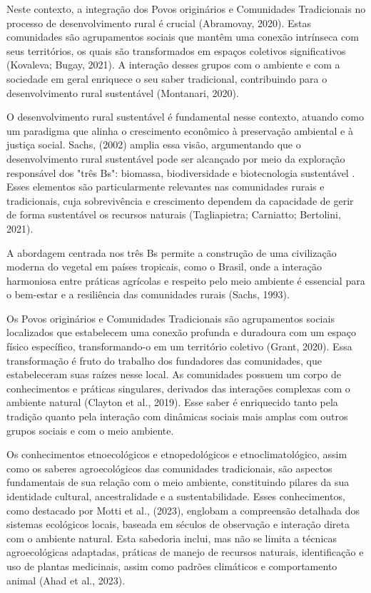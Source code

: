 Neste contexto, a integração dos Povos originários e Comunidades Tradicionais no processo de desenvolvimento rural é crucial (Abramovay, 2020). Estas comunidades são agrupamentos sociais que mantêm uma conexão intrínseca com seus territórios, os quais são transformados em espaços coletivos significativos (Kovaleva; Bugay, 2021). A interação desses grupos com o ambiente e com a sociedade em geral enriquece o seu saber tradicional, contribuindo para o desenvolvimento rural sustentável (Montanari, 2020).

O desenvolvimento rural sustentável é fundamental nesse contexto, atuando como um paradigma que alinha o crescimento econômico à preservação ambiental e à justiça social. Sachs, (2002) amplia essa visão, argumentando que o desenvolvimento rural sustentável pode ser alcançado por meio da exploração responsável dos "três Bs": biomassa, biodiversidade e biotecnologia sustentável . Esses elementos são particularmente relevantes nas comunidades rurais e tradicionais, cuja sobrevivência e crescimento dependem da capacidade de gerir de forma sustentável os recursos naturais (Tagliapietra; Carniatto; Bertolini, 2021).

A abordagem centrada nos três Bs permite a construção de uma civilização moderna do vegetal em países tropicais, como o Brasil, onde a interação harmoniosa entre práticas agrícolas e respeito pelo meio ambiente é essencial para o bem-estar e a resiliência das comunidades rurais (Sachs, 1993).

Os Povos originários e Comunidades Tradicionais são agrupamentos sociais localizados que estabelecem uma conexão profunda e duradoura com um espaço físico específico, transformando-o em um território coletivo (Grant, 2020). Essa transformação é fruto do trabalho dos fundadores das comunidades, que estabeleceram suas raízes nesse local. As comunidades possuem um corpo de conhecimentos e práticas singulares, derivados das interações complexas com o ambiente natural (Clayton et al., 2019). Esse saber é enriquecido tanto pela tradição quanto pela interação com dinâmicas sociais mais amplas com outros grupos sociais e com o meio ambiente.

Os conhecimentos etnoecológicos e etnopedológicos e etnoclimatológico, assim como os saberes agroecológicos das comunidades tradicionais, são aspectos fundamentais de sua relação com o meio ambiente, constituindo pilares da sua identidade cultural, ancestralidade e a sustentabilidade. Esses conhecimentos, como destacado por Motti et al., (2023), englobam a compreensão detalhada dos sistemas ecológicos locais, baseada em séculos de observação e interação direta com o ambiente natural. Esta sabedoria inclui, mas não se limita a técnicas agroecológicas adaptadas, práticas de manejo de recursos naturais, identificação e uso de plantas medicinais, assim como padrões climáticos e comportamento animal (Ahad et al., 2023).

